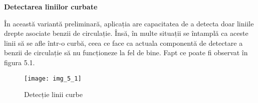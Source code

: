 \textbf{Detectarea liniilor curbate}

În această variantă preliminară, aplicația are capacitatea de a detecta doar liniile drepte asociate benzii de circulație. Însă, în multe situații se întamplă ca aceste linii să se afle într-o curbă, ceea ce face ca actuala componentă de detectare a benzii de circulație să nu funcționeze la fel de bine. Fapt ce poate fi observat în figura 5.1.

\begin{figure}[!h]
	\centering
	\texttt{[image: img\_5\_1]}
	\caption{Detecție linii curbe}
\end{figure} 